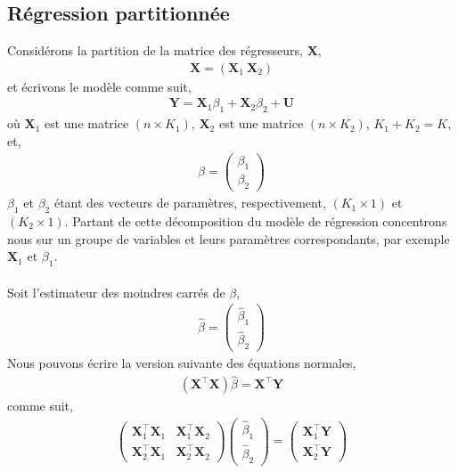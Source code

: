 \subsection{Régression partitionnée}
Considérons la partition de la matrice des régresseurs, $\mathbf{X}$,
\begin{align*}
\mathbf{X} = \left(\mathbf{X}_1 \  \mathbf{X}_2\right)
\end{align*}
et écrivons le modèle comme suit,
\begin{align*}
\mathbf{Y} = \mathbf{X}_1\beta_1 + \mathbf{X}_2\beta_2 + \mathbf{U}
\end{align*}
où $\mathbf{X}_1$ est une matrice $(n\times K_1)$, $\mathbf{X}_2$ est une matrice $(n\times K_2)$, $K_1+K_2 = K$, et,
\begin{align*}
\beta = \left(
\begin{array}{c}
\beta_1\\
\beta_2
\end{array}
\right)
\end{align*}
$\beta_1$ et $\beta_2$ étant des vecteurs de paramètres, respectivement, $(K_1\times 1)$ et $(K_2\times 1)$. Partant de cette décomposition du modèle de régression concentrons nous sur un groupe de variables et leurs paramètres correspondants, par exemple $\mathbf{X}_1$ et $\beta_1$.\\\\
 Soit l'estimateur des moindres carrés de $\beta$,
\begin{align*}
\widehat{\beta} = \left(
\begin{array}{c}
\widehat{\beta}_1\\
\widehat{\beta}_2
\end{array}
\right)
\end{align*}
Nous pouvons écrire la version suivante des équations normales,
\begin{align*}
\left(\mathbf{X}^\top\mathbf{X}\right)\widehat{\beta}=\mathbf{X}^\top\mathbf{Y}
\end{align*}
comme suit,
\begin{align*}
\left(
\begin{array}{cc}
\mathbf{X}_1^\top\mathbf{X}_1&\mathbf{X}_1^\top\mathbf{X}_2\\
\mathbf{X}_2^\top\mathbf{X}_1&\mathbf{X}_2^\top\mathbf{X}_2
\end{array}
\right)
\left(
\begin{array}{c}
\widehat{\beta}_1\\
\widehat{\beta}_2
\end{array}
\right)
=
\left(
\begin{array}{c}
\mathbf{X}_1^\top\mathbf{Y}\\
\mathbf{X}_2^\top\mathbf{Y}
\end{array}
\right)
\end{align*}
